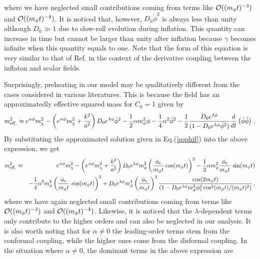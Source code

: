 \documentclass[aps,prd,amsmath,amssymb,preprintnumbers,onecolumn,11pt,nofootinbib]{revtex4}
\begin{document}
where we have neglected small contributions coming from terms like ${\cal O}((m_\phi t)^{-3})$ and ${\cal O}((m_\phi t)^{-4})$. It is noticed that, however, $D_0 \dot\phi^2$ is always less than unity  although $D_0 \gg 1$ due to slow-roll evolution during inflation. This quantity can increase in time but cannot be larger than unity after inflation because $\gamma$ becomes infinite when this quantity equals to one. Note that the form of this equation is very similar to that of Ref.\cite{ArmendarizPicon:2007iv} in the context of the derivative coupling between the inflaton and scalar fields.

Surprisingly, preheating in our model may be qualitatively different from the cases considered in various literatures. This is because the field has an approximatedly effective squared mass for $C_{0}=1$ given by
\begin{eqnarray}
m^{2}_{\rm eff.} \approx e^{\alpha\phi} m_\chi^2 - \left(e^{\alpha\phi}m^{2}_{\chi} + \frac{k^{2}}{a^{2}}\right)D_{0} e^{\lambda\phi}{\dot \phi}^{2}
- \frac 12 \alpha m_\phi^2 \phi
- \frac 14 \alpha^2 \dot\phi^2
- \frac 12\frac{D_0 e^{\lambda\phi}}{(1 - D_0 e^{\lambda\phi}\dot\phi^2)} \frac{d}{dt} \left(\dot\phi\ddot\phi\right)\,.
\label{meff}
\end{eqnarray}
By substituting the approximated solution given in Eq.(\ref{sophif}) into the above expression, we get
\begin{eqnarray}
m^{2}_{\rm eff.} &\approx& e^{\alpha\phi}m^{2}_{\chi} - \left(e^{\alpha\phi}m^{2}_{\chi} + \frac{k^{2}}{a^{2}}\right)D_{0}e^{\lambda\phi}m^{2}_{\phi}\left(\frac{\phi_{e}}{m_{\phi}t}\cos(m_{\phi}t)\right)^2
- \frac 12 \alpha m_\phi^2 \frac{\phi_{e}}{m_{\phi}t}\,\sin(m_{\phi}t)
\nonumber\\
&&
- \frac 14 \alpha^2m_\phi^2\left(\frac{\phi_{e}}{m_{\phi}t}\,\cos(m_{\phi}t)\right)^2
%
+ D_{0} e^{\lambda\phi}m_\phi^4 \left(\frac{\phi_{e}}{m_{\phi}t}\right)^2 
\frac{\cos(2 m_{\phi}t)}
{(1 - D_{0}e^{\lambda\phi} m^{2}_{\phi}\phi_{e}^2 \cos^{2}(m_{\phi}t) / (m_{\phi}t)^{2})}\,,
\label{meffr}
\end{eqnarray}
where we have again neglected small contributions coming from terms like ${\cal O}((m_\phi t)^{-3})$ and ${\cal O}((m_\phi t)^{-4})$. Likewise, it is noticed that the $\lambda$-dependent terms only contribute to the higher orders and can also be neglected in our analysis. It is also worth noting that for $\alpha\neq 0$ the leading-order terms stem from the conformal coupling, while the higher ones come from the disformal coupling. In the situation where $\alpha \neq 0$, the dominant terms in the above expression are
\end{document}
